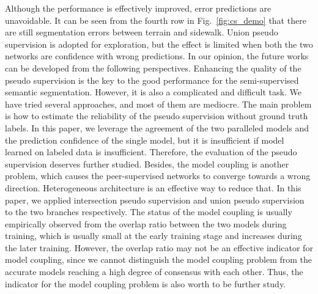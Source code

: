 \documentclass[journal]{IEEEtran}
\begin{document}
Although the performance is effectively improved, error predictions are unavoidable. It can be seen from the fourth row in Fig.~\ref{fig:cs_demo} that there are still segmentation errors 
between terrain and sidewalk. Union pseudo supervision is adopted for exploration, but the effect is limited when both the two networks are confidence with wrong predictions. 
In our opinion, the future works can be developed from the following perspectives.
Enhancing the quality of the pseudo supervision is the key to the good performance for the semi-supervised semantic segmentation. However, it is also a complicated and difficult 
task. We have tried several approaches, and most of them are mediocre. The main problem is how to estimate the reliability of the pseudo supervision without ground truth labels. 
In this paper, we leverage the agreement of the two paralleled models and the prediction confidence of the single model, but it is insufficient if model learned on labeled data 
is insufficient. Therefore, the evaluation of the pseudo supervision deserves further studied. Besides, the model coupling is another problem, which causes the peer-supervised 
networks to converge towards a wrong direction. Heterogeneous architecture is an effective way to reduce that. In this paper, we applied intersection pseudo supervision and union pseudo supervision 
to the two branches respectively. The status of the model coupling is usually empirically observed from the overlap ratio between the two models during training, 
which is usually small at the early training stage and increases during the later training. However, the overlap ratio may not be an effective indicator for model coupling, since 
we cannot distinguish the model coupling problem from the accurate models reaching a high degree of consensus with each other. Thus, the indicator for the model coupling problem is also worth 
to be further study. 


\ifCLASSOPTIONcaptionsoff
  \newpage
\fi





\end{document}
